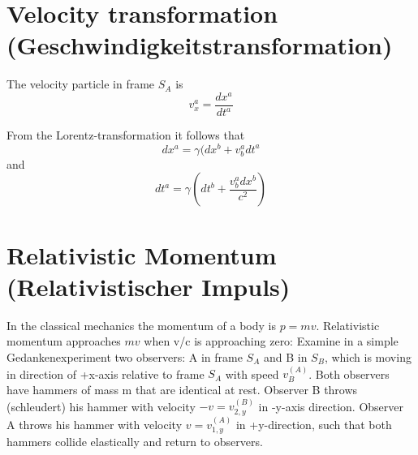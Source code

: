 \documentclass{report}
\begin{document}
\section{Velocity transformation (Geschwindigkeitstransformation)}
The velocity particle in frame $S_A$ is \[v_x^a = \frac{dx^a}{dt^a}\]

From the Lorentz-transformation it follows that
\[ dx^a = \gamma (dx^b + v_b^a dt^a\]
and
\[ dt^a = \gamma \left( dt^b + \frac{v_b^a dx^b}{c^2}\right)\]



\section{Relativistic Momentum (Relativistischer Impuls)}

In the classical mechanics the momentum of a body is $p = mv$. Relativistic momentum approaches $mv$ when v/c is approaching zero:
Examine in a simple Gedankenexperiment two observers: A in frame $S_A$ and B in $S_B$, which is moving in direction of +x-axis relative to frame $S_A$ with speed $v_B^{(A)}$. Both observers have hammers of mass m that are identical at rest. Observer B throws (schleudert) his hammer with velocity $-v = v_{2, y}^{(B)}$ in -y-axis direction. Observer A throws his hammer with velocity $v = v_{1, y}^{(A)}$ in +y-direction, such that both hammers collide elastically and return to observers.
\end{document}

